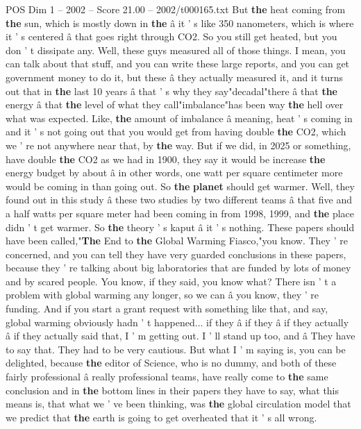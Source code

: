 \begin{textsample}{POS Dim 1 – 2002 – Score 21.00 – 2002/t000165.txt}
But \textbf{the} heat coming from \textbf{the} sun, which is mostly down in \textbf{the} â it ' s like 350 nanometers, which is where it ' s centered â that goes right through CO2.
So you still get heated, but you don ' t dissipate any.
Well, these guys measured all of those things.
I mean, you can talk about that stuff, and you can write these large reports, and you can get government money to do it, but these â they actually measured it, and it turns out that in \textbf{the} last 10 years â that ' s why they say"decadal"there â that \textbf{the} energy â that \textbf{the} level of what they call"imbalance"has been way \textbf{the} hell over what was expected.
Like, \textbf{the} amount of imbalance â meaning, heat ' s coming in and it ' s not going out that you would get from having double \textbf{the} CO2, which we ' re not anywhere near that, by \textbf{the} way.
But if we did, in 2025 or something, have double \textbf{the} CO2 as we had in 1900, they say it would be increase \textbf{the} energy budget by about â in other words, one watt per square centimeter more would be coming in than going out.
So \textbf{the} \textbf{planet} should get warmer.
Well, they found out in this study â these two studies by two different teams â that five and a half watts per square meter had been coming in from 1998, 1999, and \textbf{the} place didn ' t get warmer.
So \textbf{the} theory ' s kaput â it ' s nothing.
These papers should have been called,"\textbf{The} End to \textbf{the} Global Warming Fiasco,"you know.
They ' re concerned, and you can tell they have very guarded conclusions in these papers, because they ' re talking about big laboratories that are funded by lots of money and by scared people.
You know, if they said, you know what?
There isn ' t a problem with global warming any longer, so we can â you know, they ' re funding.
And if you start a grant request with something like that, and say, global warming obviously hadn ' t happened... if they â if they â if they actually â if they actually said that, I ' m getting out.
I ' ll stand up too, and â They have to say that.
They had to be very cautious.
But what I ' m saying is, you can be delighted, because \textbf{the} editor of Science, who is no dummy, and both of these fairly professional â really professional teams, have really come to \textbf{the} same conclusion and in \textbf{the} bottom lines in their papers they have to say, what this means is, that what we ' ve been thinking, was \textbf{the} global circulation model that we predict that \textbf{the} earth is going to get overheated that it ' s all wrong.

\end{textsample}
